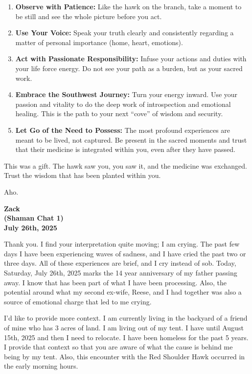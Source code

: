 \documentclass{article}
\begin{document}
\begin{enumerate}
\item
  \textbf{Observe with Patience:} Like the hawk on the branch, take a moment to be still and see the whole picture before you act.
\item
  \textbf{Use Your Voice:} Speak your truth clearly and consistently regarding a matter of personal importance (home, heart, emotions).
\item
  \textbf{Act with Passionate Responsibility:} Infuse your actions and duties with your life force energy. Do not see your path as a burden, but as your sacred work.
\item
  \textbf{Embrace the Southwest Journey:} Turn your energy inward. Use your passion and vitality to do the deep work of introspection and emotional healing. This is the path to your next ``cove'' of wisdom and security.
\item
  \textbf{Let Go of the Need to Possess:} The most profound experiences are meant to be lived, not captured. Be present in the sacred moments and trust that their medicine is integrated within you, even after they have passed.
\end{enumerate}

This was a gift. The hawk saw you, you saw it, and the medicine was exchanged. Trust the wisdom that has been planted within you.

Aho.


\begin{center}
\textbf{Zack}\\
\textbf{(Shaman Chat 1)}\\
\textbf{July 26th, 2025}
\end{center}

Thank you. I find your interpretation quite moving; I am crying. The past few days I have been experiencing waves of sadness, and I have cried the past two or three days. All of these experiences are brief, and I cry instead of sob. Today, Saturday, July 26th, 2025 marks the 14 year anniversary of my father passing away. I know that has been part of what I have been processing. Also, the potential around what my second ex-wife, Reese, and I had together was also a source of emotional charge that led to me crying.

I'd like to provide more context. I am currently living in the backyard of a friend of mine who has 3 acres of land. I am living out of my tent. I have until August 15th, 2025 and then I need to relocate. I have been homeless for the past 5 years. I provide that context so that you are aware of what the cause is behind me being by my tent. Also, this encounter with the Red Shoulder Hawk occurred in the early morning hours.
\end{document}
